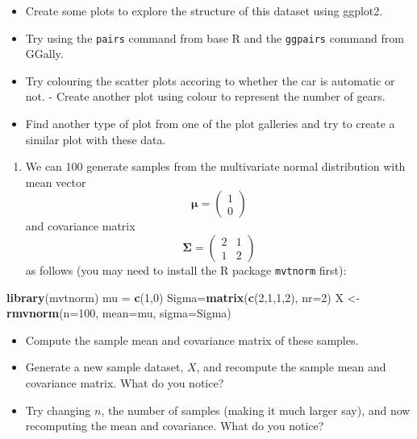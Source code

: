 \documentclass[]{book}
\newenvironment{Shaded}{\begin{snugshade}}{\end{snugshade}}
\newcommand{\DataTypeTok}[1]{\textcolor[rgb]{0.13,0.29,0.53}{#1}}
\newcommand{\DecValTok}[1]{\textcolor[rgb]{0.00,0.00,0.81}{#1}}
\newcommand{\KeywordTok}[1]{\textcolor[rgb]{0.13,0.29,0.53}{\textbf{#1}}}
\newcommand{\NormalTok}[1]{#1}
\newcommand{\StringTok}[1]{\textcolor[rgb]{0.31,0.60,0.02}{#1}}
\providecommand{\tightlist}{%
  \setlength{\itemsep}{0pt}\setlength{\parskip}{0pt}}
\theoremstyle{definition}
\theoremstyle{definition}
\theoremstyle{definition}
\theoremstyle{remark}
\begin{document}
\begin{itemize}
\tightlist
\item
  Create some plots to explore the structure of this dataset using ggplot2.
\item
  Try using the \texttt{pairs} command from base R and the \texttt{ggpairs} command from GGally.
\item
  Try colouring the scatter plots accoring to whether the car is automatic or not. - Create another plot using colour to represent the number of gears.
\item
  Find another type of plot from one of the plot galleries and try to create a similar plot with these data.
\end{itemize}

\begin{enumerate}
\def\labelenumi{\arabic{enumi}.}
\setcounter{enumi}{3}
\tightlist
\item
  We can 100 generate samples from the multivariate normal distribution with mean vector
  \[\boldsymbol \mu= \left(\begin{array}{c}1\\0\end{array}\right)\]
  and covariance matrix
  \[\boldsymbol \Sigma= \left(\begin{array}{cc}2&1\\1&2\end{array}\right)\]
  as follows (you may need to install the R package \texttt{mvtnorm} first):
\end{enumerate}

\begin{Shaded}
\begin{Highlighting}[]
\KeywordTok{library}\NormalTok{(mvtnorm)}
\NormalTok{mu =}\StringTok{ }\KeywordTok{c}\NormalTok{(}\DecValTok{1}\NormalTok{,}\DecValTok{0}\NormalTok{)}
\NormalTok{Sigma=}\KeywordTok{matrix}\NormalTok{(}\KeywordTok{c}\NormalTok{(}\DecValTok{2}\NormalTok{,}\DecValTok{1}\NormalTok{,}\DecValTok{1}\NormalTok{,}\DecValTok{2}\NormalTok{), }\DataTypeTok{nr=}\DecValTok{2}\NormalTok{)}
\NormalTok{X <-}\StringTok{ }\KeywordTok{rmvnorm}\NormalTok{(}\DataTypeTok{n=}\DecValTok{100}\NormalTok{, }\DataTypeTok{mean=}\NormalTok{mu, }\DataTypeTok{sigma=}\NormalTok{Sigma)}
\end{Highlighting}
\end{Shaded}

\begin{itemize}
\tightlist
\item
  Compute the sample mean and covariance matrix of these samples.
\item
  Generate a new sample dataset, \(X\), and recompute the sample mean and covariance matrix. What do you notice?
\item
  Try changing \(n\), the number of samples (making it much larger say), and now recomputing the mean and covariance. What do you notice?
\end{itemize}
\end{document}
